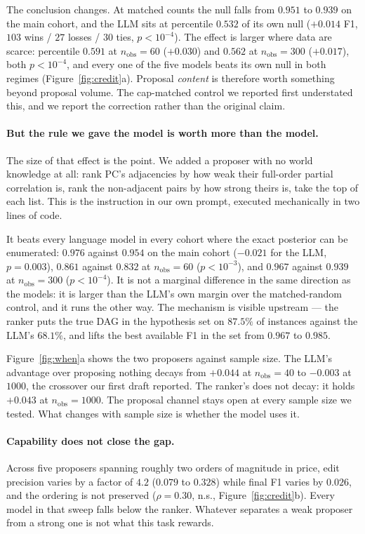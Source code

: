 \documentclass{article}
\begin{document}
The conclusion changes. At matched counts the null falls from $0.951$ to $0.939$ on the main cohort,
and the LLM sits at percentile $0.532$ of its own null ($+0.014$ F1, $103$ wins / $27$ losses / $30$
ties, $p<10^{-4}$). The effect is larger where data are scarce: percentile $0.591$ at
$n_{\mathrm{obs}}{=}60$ ($+0.030$) and $0.562$ at $n_{\mathrm{obs}}{=}300$ ($+0.017$), both
$p<10^{-4}$, and every one of the five models beats its own null in both regimes
(Figure~\ref{fig:credit}a). Proposal \emph{content} is therefore worth something beyond proposal
volume. The cap-matched control we reported first understated this, and we report the correction
rather than the original claim.

\paragraph{But the rule we gave the model is worth more than the model.}
The size of that effect is the point. We added a proposer with no world knowledge at all: rank PC's
adjacencies by how weak their full-order partial correlation is, rank the non-adjacent pairs by how
strong theirs is, take the top of each list. This is the instruction in our own prompt, executed
mechanically in two lines of code.

It beats every language model in every cohort where the exact posterior can be enumerated: $0.976$
against $0.954$ on the main cohort ($-0.021$ for the LLM, $p=0.003$), $0.861$ against $0.832$ at
$n_{\mathrm{obs}}{=}60$ ($p<10^{-3}$), and $0.967$ against $0.939$ at $n_{\mathrm{obs}}{=}300$
($p<10^{-4}$). It is not a marginal difference in the same direction as the models: it is larger
than the LLM's own margin over the matched-random control, and it runs the other way. The mechanism
is visible upstream --- the ranker puts the true DAG in the hypothesis set on $87.5\%$ of instances
against the LLM's $68.1\%$, and lifts the best available F1 in the set from $0.967$ to $0.985$.

Figure~\ref{fig:when}a shows the two proposers against sample size. The LLM's advantage over
proposing nothing decays from $+0.044$ at $n_{\mathrm{obs}}{=}40$ to $-0.003$ at $1000$, the
crossover our first draft reported. The ranker's does not decay: it holds $+0.043$ at
$n_{\mathrm{obs}}{=}1000$. The proposal channel stays open at every sample size we tested. What
changes with sample size is whether the model uses it.

\paragraph{Capability does not close the gap.}
Across five proposers spanning roughly two orders of magnitude in price, edit precision varies by a
factor of $4.2$ ($0.079$ to $0.328$) while final F1 varies by $0.026$, and the ordering is not
preserved ($\rho=0.30$, n.s., Figure~\ref{fig:credit}b). Every model in that sweep falls below the
ranker. Whatever separates a weak proposer from a strong one is not what this task rewards.
\end{document}
